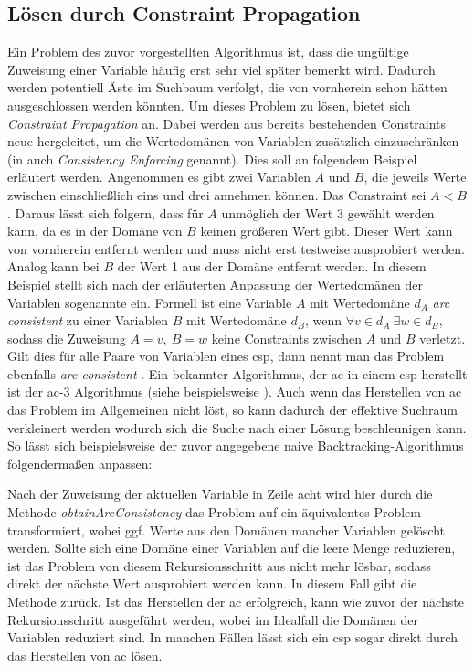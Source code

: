 \subsection{Lösen durch Constraint Propagation}
Ein Problem des zuvor vorgestellten Algorithmus ist, dass die ungültige Zuweisung einer Variable häufig erst sehr viel später bemerkt wird. Dadurch werden potentiell Äste im
Suchbaum verfolgt, die von vornherein schon hätten ausgeschlossen werden könnten. Um dieses Problem zu lösen, bietet sich \textit{Constraint Propagation} an. Dabei werden
aus bereits bestehenden Constraints neue hergeleitet, um die Wertedomänen von Variablen zusätzlich einzuschränken (in \cite{OrderingHeuristics} auch \textit{Consistency
Enforcing} genannt). Dies soll an folgendem Beispiel erläutert werden. Angenommen es gibt zwei Variablen $A$ und $B$, die jeweils Werte zwischen einschließlich eins und drei
annehmen können. Das Constraint sei $A < B$. Daraus lässt sich folgern, dass für $A$ unmöglich der Wert 3 gewählt werden kann, da es in der Domäne von $B$ keinen größeren
Wert gibt. Dieser Wert kann von vornherein entfernt werden und muss nicht erst testweise ausprobiert werden. Analog kann bei $B$ der Wert 1 aus der Domäne entfernt werden. In
diesem Beispiel stellt sich nach der erläuterten Anpassung der Wertedomänen der Variablen sogenannte  ein. Formell ist eine Variable $A$ mit Wertedomäne $d_A$ \textit{arc
consistent} zu einer Variablen $B$ mit Wertedomäne $d_B$, wenn $\forall v \in d_A \ \exists w \in d_B$, sodass die Zuweisung $A = v, \ B = w$ keine Constraints zwischen $A$ und
$B$ verletzt. Gilt dies für alle Paare von Variablen eines \ac*{csp}, dann nennt man das Problem ebenfalls \textit{arc consistent} \cite{ACOverview}. Ein bekannter
Algorithmus, der \ac*{ac} in einem \ac*{csp} herstellt ist der \ac*{ac}-3 Algorithmus (siehe beispielsweise \cite{ac3}). Auch wenn das Herstellen von \ac*{ac} das Problem im
Allgemeinen nicht löst, so kann dadurch der effektive Suchraum verkleinert werden wodurch sich die Suche nach einer Lösung beschleunigen kann. So lässt sich beispielsweise der
zuvor angegebene naive Backtracking-Algorithmus folgendermaßen anpassen:

Nach der Zuweisung der aktuellen Variable in Zeile acht wird hier durch die Methode \textit{obtainArcConsistency} das Problem auf ein äquivalentes Problem transformiert, wobei
ggf. Werte aus den Domänen mancher Variablen gelöscht werden. Sollte sich eine Domäne einer Variablen auf die leere Menge reduzieren, ist das Problem von diesem Rekursionsschritt
aus nicht mehr lösbar, sodass direkt der nächste Wert ausprobiert werden kann. In diesem Fall gibt die Methode  zurück. Ist das Herstellen der \ac*{ac} erfolgreich,
kann wie zuvor der nächste Rekursionsschritt ausgeführt werden, wobei im Idealfall die Domänen der Variablen reduziert sind. In manchen Fällen lässt sich ein \ac*{csp} sogar
direkt durch das Herstellen von \ac*{ac} lösen.